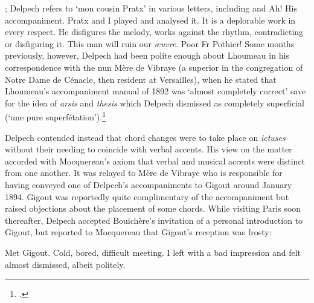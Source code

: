   {; Delpech refers to `mon cousin Pratx' in various letters, including   and }
{Ah! His accompaniment. Pratx and I played and analysed it. It is a deplorable work in every respect. He disfigures the melody, works against the rhythm, contradicting or disfiguring it. This man will ruin our \emph{œuvre}. Poor Fr Pothier!}
\noindent
Some months previously, however, Delpech had been polite enough about Lhoumeau in his correspondence with the nun Mère de Vibraye (a superior in the congregation of Notre Dame de Cénacle, then resident at Versailles), when he stated that Lhoumeau's accompaniment manual of 1892 was `almost completely correct' save for the idea of \emph{arsis} and \emph{thesis} which Delpech dismissed as completely superficial (`une pure superfétation').\footnote{.\label{fn:delpech_vibraye}}

Delpech contended instead that chord changes were to take place on \emph{ictuses} without their needing to coincide with verbal accents.
His view on the matter accorded with \mbox{Mocquereau's} axiom that verbal and musical accents were distinct from one another.
It was relayed to Mère de Vibraye who is responsible for having conveyed one of Delpech's accompaniments to Gigout around January 1894.
Gigout was reportedly quite complimentary of the accompaniment but raised objections about the placement of some chords.
While visiting Paris soon thereafter, Delpech accepted Bouichère's invitation of a personal introduction to Gigout, but reported to Mocquereau that Gigout's reception was frosty:

  {}
{Met Gigout. Cold, bored, difficult meeting. I left with a bad impression and felt almost dismissed, albeit politely.}

